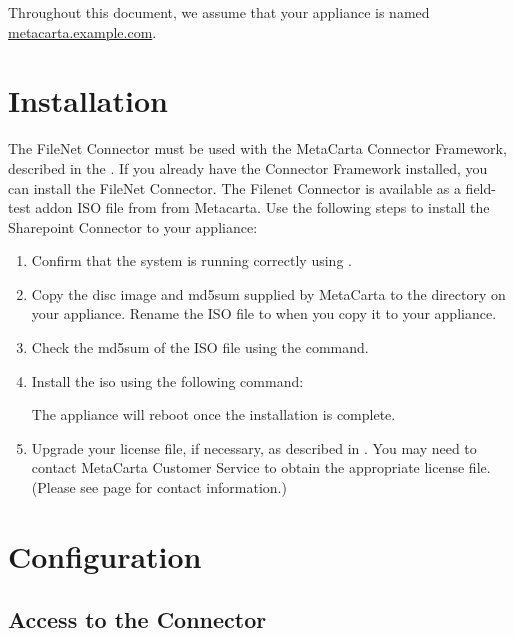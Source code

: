 \begin{changemargin}{1.5in}{0in}
Throughout this document, we assume that your appliance is named \\
\url{metacarta.example.com}.

\section{Installation}

The FileNet Connector must be used with the MetaCarta Connector
Framework, described in the . If you already have the Connector Framework installed, you can
install the FileNet Connector.  The Filenet Connector is
available as a field-test addon ISO file from from Metacarta. Use the
following steps to install the Sharepoint Connector to your appliance:

\begin{enumerate}

\item Confirm that the system is running correctly using
.

\item Copy the disc image and md5sum supplied by MetaCarta to the
 directory on your appliance. Rename the ISO file to
 when you copy it to your appliance.

\item Check the md5sum of the ISO file using the  command.

\item Install the iso using the following command:


The appliance will reboot once the installation is complete.

\item Upgrade your license file, if necessary, as described in
. You may need
to contact MetaCarta Customer Service to obtain the appropriate
license file. (Please see page \pageref{SupportContact} for contact
information.)
 
\end{enumerate}

\section{Configuration}

\subsection{Access to the Connector}


\end{changemargin}
